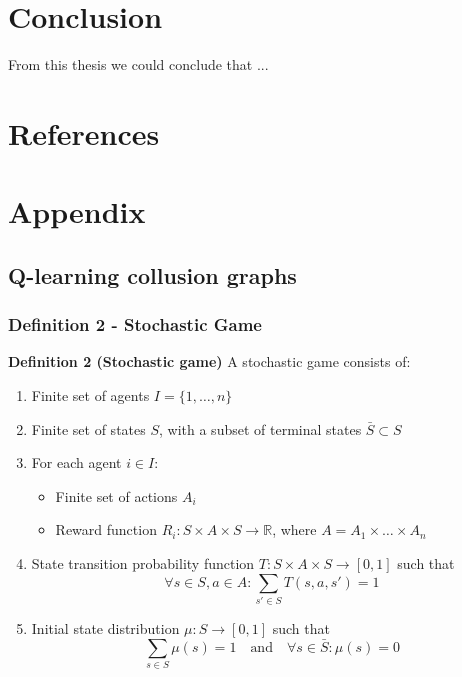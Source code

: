 \documentclass{article}
\begin{document}
\section{Conclusion}
From this thesis we could conclude that ... 





\newpage 
\section{References}





\section{Appendix}
\subsection{Q-learning collusion graphs}
\subsubsection{ Definition 2 - Stochastic Game}
\label{stochasticgamedef}
\textbf{Definition 2 (Stochastic game)\citep[p. 47-48]{marl-book}} A stochastic game consists of:
\begin{enumerate}
    \item Finite set of agents \( I = \{1, \dots, n\} \)
    \item Finite set of states \( S \), with a subset of terminal states \( \bar{S} \subset S \)
    \item For each agent \( i \in I \):
    \begin{itemize}
        \item Finite set of actions \( A_i \)
        \item Reward function \( R_i: S \times A \times S\to \mathbb{R} \), where \( A = A_1 \times \dots \times A_n \)
    \end{itemize}
    \item State transition probability function \( T: S \times A \times S \to [0, 1] \) such that
    \[
    \forall s \in S, a \in A : \sum_{s' \in S} T(s, a, s') = 1
    \]
    \item Initial state distribution \( \mu: S \to [0, 1] \) such that
    \[
    \sum_{s \in S} \mu(s) = 1 \quad \text{and} \quad \forall s \in \bar{S}: \mu(s) = 0
    \]
\end{enumerate}
\end{document}
